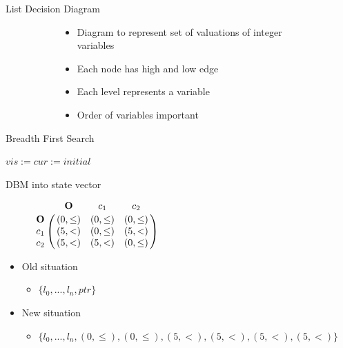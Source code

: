 \begin{frame}{List Decision Diagram}
\begin{figure}
\begin{subfigure}[b]{.4\textwidth}
\begin{tikzpicture}[
		smallvertex/.style={circle,draw,scale=0.8}
		]
	\end{tikzpicture}
	\end{subfigure}
	\begin{subfigure}[b]{.4\textwidth}
		\begin{itemize}
			\item Diagram to represent set of valuations of integer variables
			\item Each node has high and low edge
			\item Each level represents a variable
			\item Order of variables important
		\end{itemize}
	\end{subfigure}
\label{fig:ldd-example}
\end{figure}
\end{frame}

\begin{frame}{Breadth First Search}

\begin{algorithmic}[1]
	\State $vis := cur := initial$
	\EndWhile
	
\EndProcedure	
\end{algorithmic}

\end{frame}

\begin{frame}{DBM into state vector}
\begin{figure}
	\centering
	\begin{math}
 \bordermatrix{ 		                 & \mathbf{O} & c_1           & c_2        \cr
 			\mathbf{O} &(0,\leq)      & (0,\leq)      & (0,\leq)     \cr
 			c_1        &(5,<)      & (0,\leq)      & (5,<)\cr
 			c_2        &(5,<)      & (5,<) & (0,\leq)     \cr}
	\end{math}
\end{figure}


\begin{itemize}
	\item Old situation
	\begin{itemize}
		\item $\{l_0,...,l_n,ptr\}$
	\end{itemize}
	\item New situation
	\begin{itemize}
		\item $\{l_0,...,l_n,(0,\leq),(0,\leq),(5,<),(5,<),(5,<),(5,<)\}$
	\end{itemize}
\end{itemize}
\end{frame}

